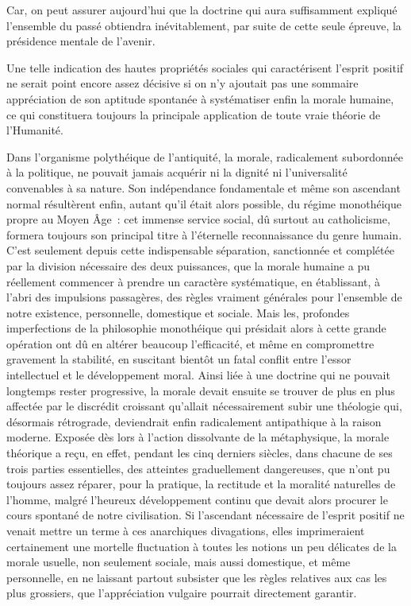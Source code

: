 \documentclass[french,twoside]{book} %
\begin{document}
Car, on peut assurer aujourd’hui que la doctrine qui aura suffisamment expliqué l’ensemble du passé obtiendra inévitablement, par suite de cette seule épreuve, la présidence mentale de l’avenir.\par
Une telle indication des hautes propriétés sociales qui caractérisent l’esprit positif ne serait point encore assez décisive si on n’y ajoutait pas une sommaire appréciation de son aptitude spontanée à systématiser enfin la morale humaine, ce qui constituera toujours la principale application de toute vraie théorie de l’Humanité.\par
Dans l’organisme polythéique de l’antiquité, la morale, radicalement subordonnée à la politique, ne pouvait jamais acquérir ni la dignité ni l’universalité convenables à sa nature. Son indépendance fondamentale et même son ascendant normal résultèrent enfin, autant qu’il était alors possible, du régime monothéique propre au Moyen Âge : cet immense service social, dû surtout au catholicisme, formera toujours son principal titre à l’éternelle reconnaissance du genre humain. C’est seulement depuis cette indispensable séparation, sanctionnée et complétée par la division nécessaire des deux puissances, que la morale humaine a pu réellement commencer à prendre un caractère systématique, en établissant, à l’abri des impulsions passagères, des règles vraiment générales pour l’ensemble de notre existence, personnelle, domestique et sociale. Mais les, profondes imperfections de la philosophie monothéique qui présidait alors à cette grande opération ont dû en altérer beaucoup l’efficacité, et même en compromettre gravement la stabilité, en suscitant bientôt un fatal conflit entre l’essor intellectuel et le développement moral. Ainsi liée à une doctrine qui ne pouvait longtemps rester progressive, la morale devait ensuite se trouver de plus en plus affectée par le discrédit croissant qu’allait nécessairement subir une théologie qui, désormais rétrograde, deviendrait enfin radicalement antipathique à la raison moderne. Exposée dès lors à l’action dissolvante de la métaphysique, la morale théorique a reçu, en effet, pendant les cinq derniers siècles, dans chacune de ses trois parties essentielles, des atteintes graduellement dangereuses, que n’ont pu toujours assez réparer, pour la pratique, la rectitude et la moralité naturelles de l’homme, malgré l’heureux développement continu que devait alors procurer le cours spontané de notre civilisation. Si l’ascendant nécessaire de l’esprit positif ne venait mettre un terme à ces anarchiques divagations, elles imprimeraient certainement une mortelle fluctuation à toutes les notions un peu délicates de la morale usuelle, non seulement sociale, mais aussi domestique, et même personnelle, en ne laissant partout subsister que les règles relatives aux cas les plus grossiers, que l’appréciation vulgaire pourrait directement garantir.\par
\end{document}

